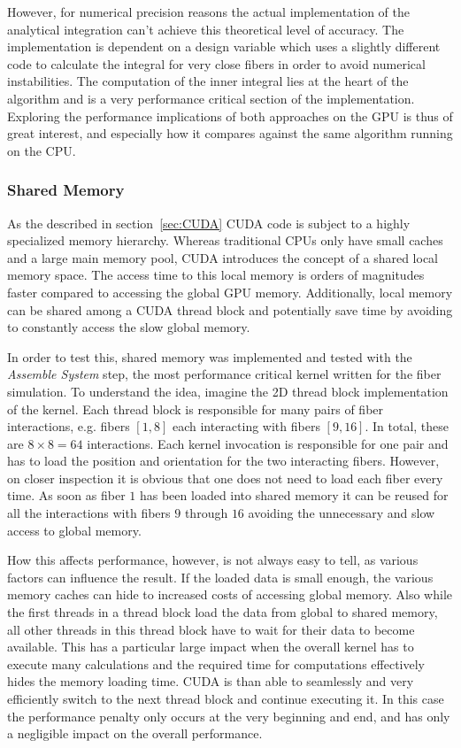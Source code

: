 \documentclass[a4paper,11pt]{kth-mag}
\begin{document}
However, for numerical precision reasons the actual implementation of the analytical integration can't achieve this theoretical level of accuracy. The implementation is dependent on a design variable which uses a slightly different code to calculate the integral for very close fibers in order to avoid numerical instabilities. The computation of the inner integral lies at the heart of the algorithm and is a very performance critical section of the implementation. Exploring the performance implications of both approaches on the GPU is thus of great interest, and especially how it compares against the same algorithm running on the CPU.

\subsubsection{Shared Memory}

As the described in section~\ref{sec:CUDA} CUDA code is subject to a highly specialized memory hierarchy. Whereas traditional CPUs only have small caches and a large main memory pool, CUDA introduces the concept of a shared local memory space. The access time to this local memory is orders of magnitudes faster compared to accessing the global GPU memory. Additionally, local memory can be shared among a CUDA thread block and potentially save time by avoiding to constantly access the slow global memory.

In order to test this, shared memory was implemented and tested with the \emph{Assemble System} step, the most performance critical kernel written for the fiber simulation. To understand the idea, imagine the 2D thread block implementation of the kernel. Each thread block is responsible for many pairs of fiber interactions, e.g. fibers $[1,8]$ each interacting with fibers $[9,16]$. In total, these are $8 \times 8 = 64$ interactions. Each kernel invocation is responsible for one pair and has to load the position and orientation for the two interacting fibers. However, on closer inspection it is obvious that one does not need to load each fiber every time. As soon as fiber $1$ has been loaded into shared memory it can be reused for all the interactions with fibers $9$ through $16$ avoiding the unnecessary and slow access to global memory.

How this affects performance, however, is not always easy to tell, as various factors can influence the result. If the loaded data is small enough, the various memory caches can hide to increased costs of accessing global memory. Also while the first threads in a thread block load the data from global to shared memory, all other threads in this thread block have to wait for their data to become available. This has a particular large impact when the overall kernel has to execute many calculations and the required time for computations effectively hides the memory loading time. CUDA is than able to seamlessly and very efficiently switch to the next thread block and continue executing it. In this case the performance penalty only occurs at the very beginning and end, and has only a negligible impact on the overall performance.
\end{document}
